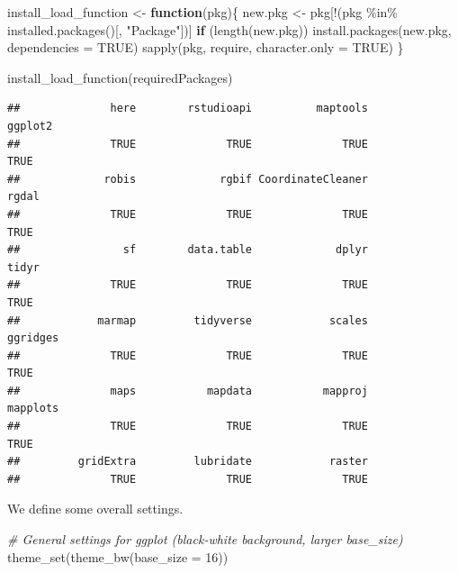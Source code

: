 \documentclass[
]{book}
\newenvironment{Shaded}{\begin{snugshade}}{\end{snugshade}}
\newcommand{\AttributeTok}[1]{\textcolor[rgb]{0.77,0.63,0.00}{#1}}
\newcommand{\CommentTok}[1]{\textcolor[rgb]{0.56,0.35,0.01}{\textit{#1}}}
\newcommand{\ConstantTok}[1]{\textcolor[rgb]{0.00,0.00,0.00}{#1}}
\newcommand{\ControlFlowTok}[1]{\textcolor[rgb]{0.13,0.29,0.53}{\textbf{#1}}}
\newcommand{\DecValTok}[1]{\textcolor[rgb]{0.00,0.00,0.81}{#1}}
\newcommand{\FunctionTok}[1]{\textcolor[rgb]{0.00,0.00,0.00}{#1}}
\newcommand{\NormalTok}[1]{#1}
\newcommand{\OtherTok}[1]{\textcolor[rgb]{0.56,0.35,0.01}{#1}}
\newcommand{\SpecialCharTok}[1]{\textcolor[rgb]{0.00,0.00,0.00}{#1}}
\newcommand{\StringTok}[1]{\textcolor[rgb]{0.31,0.60,0.02}{#1}}
\begin{document}
\begin{Shaded}
\begin{Highlighting}[]
\NormalTok{install\_load\_function }\OtherTok{\textless{}{-}} \ControlFlowTok{function}\NormalTok{(pkg)\{}
\NormalTok{  new.pkg }\OtherTok{\textless{}{-}}\NormalTok{ pkg[}\SpecialCharTok{!}\NormalTok{(pkg }\SpecialCharTok{\%in\%} \FunctionTok{installed.packages}\NormalTok{()[, }\StringTok{"Package"}\NormalTok{])]}
  \ControlFlowTok{if}\NormalTok{ (}\FunctionTok{length}\NormalTok{(new.pkg))}
    \FunctionTok{install.packages}\NormalTok{(new.pkg, }\AttributeTok{dependencies =} \ConstantTok{TRUE}\NormalTok{)}
  \FunctionTok{sapply}\NormalTok{(pkg, require, }\AttributeTok{character.only =} \ConstantTok{TRUE}\NormalTok{)}
\NormalTok{\}}

\FunctionTok{install\_load\_function}\NormalTok{(requiredPackages)}
\end{Highlighting}
\end{Shaded}

\begin{verbatim}
##              here        rstudioapi          maptools           ggplot2 
##              TRUE              TRUE              TRUE              TRUE 
##             robis             rgbif CoordinateCleaner             rgdal 
##              TRUE              TRUE              TRUE              TRUE 
##                sf        data.table             dplyr             tidyr 
##              TRUE              TRUE              TRUE              TRUE 
##            marmap         tidyverse            scales          ggridges 
##              TRUE              TRUE              TRUE              TRUE 
##              maps           mapdata           mapproj          mapplots 
##              TRUE              TRUE              TRUE              TRUE 
##         gridExtra         lubridate            raster 
##              TRUE              TRUE              TRUE
\end{verbatim}

We define some overall settings.

\begin{Shaded}
\begin{Highlighting}[]
\CommentTok{\# General settings for ggplot (black{-}white background, larger base\_size)}
\FunctionTok{theme\_set}\NormalTok{(}\FunctionTok{theme\_bw}\NormalTok{(}\AttributeTok{base\_size =} \DecValTok{16}\NormalTok{))}
\end{Highlighting}
\end{Shaded}
\end{document}
